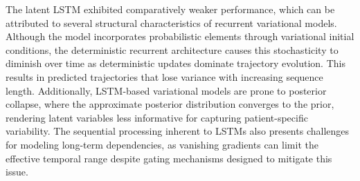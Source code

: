 \documentclass[preprint,12pt]{elsarticle}
\begin{document}
The latent LSTM exhibited comparatively weaker performance, which can be attributed to several structural characteristics of recurrent variational models. Although the model incorporates probabilistic elements through variational initial conditions, the deterministic recurrent architecture causes this stochasticity to diminish over time as deterministic updates dominate trajectory evolution. This results in predicted trajectories that lose variance with increasing sequence length. Additionally, LSTM-based variational models are prone to posterior collapse, where the approximate posterior distribution converges to the prior, rendering latent variables less informative for capturing patient-specific variability. The sequential processing inherent to LSTMs also presents challenges for modeling long-term dependencies, as vanishing gradients can limit the effective temporal range despite gating mechanisms designed to mitigate this issue.
\end{document}
